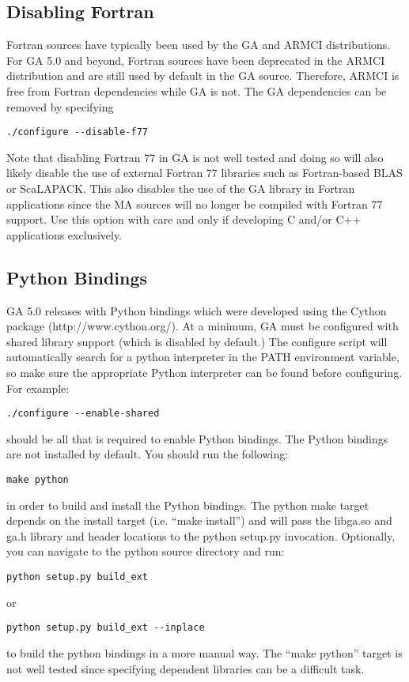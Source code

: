\subsection{Disabling Fortran}

Fortran sources have typically been used by the GA and ARMCI distributions.
For GA 5.0 and beyond, Fortran sources have been deprecated in the ARMCI
distribution and are still used by default in the GA source.  Therefore, ARMCI
is free from Fortran dependencies while GA is not.  The GA dependencies can be
removed by specifying 
\begin{verbatim}
./configure --disable-f77
\end{verbatim}
Note that disabling Fortran 77 in GA is not well tested and doing so will also
likely disable the use of external Fortran 77 libraries such as Fortran-based
BLAS or ScaLAPACK. This also disables the use of the GA library in Fortran
applications since the MA sources will no longer be compiled with Fortran 77
support. Use this option with care and only if developing C and/or C++
applications exclusively. 

\subsection{Python Bindings}

GA 5.0 releases with Python bindings which were developed using the Cython
package (http://www.cython.org/). At a minimum, GA must be configured with
shared library support (which is disabled by default.) The configure script
will automatically search for a python interpreter in the PATH environment
variable, so make sure the appropriate Python interpreter can be found before
configuring. For example: 
\begin{verbatim}
./configure --enable-shared
\end{verbatim}
should be all that is required to enable Python bindings. The Python bindings
are not installed by default. You should run the following: 
\begin{verbatim}
make python
\end{verbatim}
in order to build and install the Python bindings. The python make target
depends on the install target (i.e. ``make install'') and will pass the
libga.so and ga.h library and header locations to the python setup.py
invocation. Optionally, you can navigate to the python source directory and
run: 
\begin{verbatim}
python setup.py build_ext
\end{verbatim}
or 
\begin{verbatim}
python setup.py build_ext --inplace
\end{verbatim}
to build the python bindings in a more manual way. The ``make python'' target
is not well tested since specifying dependent libraries can be a difficult
task. 


